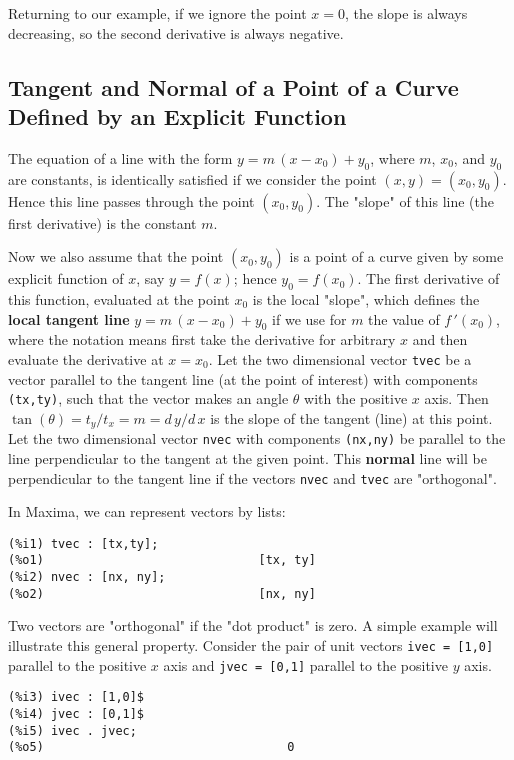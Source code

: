 \documentclass[12pt]{article}
\begin{document}
Returning to our example, if we ignore the point $x=0$, the slope is always
 decreasing, so the second derivative is always negative.

\subsection{Tangent and Normal of a Point of a Curve Defined by an Explicit Function} \label{explicit}

The equation of a line with the form $y = m\, (x - x_0) + y_0$, where $m$, $x_0$, and $y_0$ 
  are constants, is identically satisfied if we consider the point $(x,y) = (x_0,y_0)$.
Hence this line passes through the point $(x_0, y_0)$.
The "slope" of this line (the first derivative) is the constant $m$.

\smallskip

Now we also assume that the point $(x_0, y_0)$ is a point of a curve given by some
  explicit function of $x$, say $y = f(x)$; hence $y_0 = f(x_0)$.
The first derivative of this function, evaluated at the point $x_0$ is the local
  "slope", which defines the \textbf{local tangent line} $y = m \,(x - x_0) + y_0$ if
  we use for $m$ the value of $f\,'(x_0)$, where the notation means first take the derivative for arbitrary
  $x$ and then evaluate the derivative at $x = x_0$.
\smallskip
Let the two dimensional vector \verb|tvec| be a vector parallel to the tangent line (at the
  point of interest) with components \verb|(tx,ty)|, such that the vector makes an angle
  $ \theta$ with the positive $x$ axis.
Then $\tan(\theta) = t_{y}/t_{x} = m = d\,y/d\,x $ is the slope of the tangent (line) at this point.
Let the two dimensional vector \verb|nvec| with components \verb|(nx,ny)| be parallel to the
line perpendicular to the tangent at the given point.
This \textbf{normal} line will be perpendicular to the tangent line if the vectors \verb|nvec| and
  \verb|tvec| are "orthogonal".
\newpage
  
In Maxima, we can represent vectors by lists:
\small
\begin{verbatim}
(%i1) tvec : [tx,ty];
(%o1)                              [tx, ty]
(%i2) nvec : [nx, ny];
(%o2)                              [nx, ny]
\end{verbatim}
\normalsize
Two vectors are "orthogonal" if the "dot product" is zero.
A simple example will illustrate this general property.
Consider the pair of unit vectors \verb|ivec = [1,0]| parallel to the positive
 $x$ axis and \verb|jvec = [0,1]| parallel to the positive $y$ axis.
\small
\begin{verbatim}
(%i3) ivec : [1,0]$
(%i4) jvec : [0,1]$
(%i5) ivec . jvec;
(%o5)                                  0
\end{verbatim}
\normalsize
\end{document}
